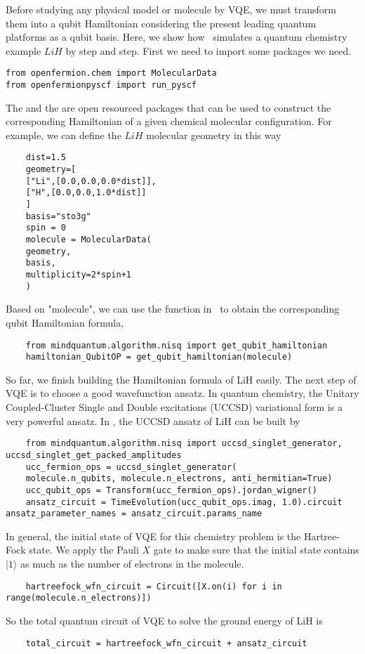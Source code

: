 Before studying any physical model or molecule by VQE, we must transform them into a qubit Hamiltonian considering the present leading quantum platforms as a qubit basis.
Here, we show how \MindQuantum\ simulates a quantum chemistry example $LiH$ by step and step.
First we need to import some packages we need.
\begin{lstlisting}
from openfermion.chem import MolecularData
from openfermionpyscf import run_pyscf
\end{lstlisting}
The  and the  are open resourced packages that can be used to construct the corresponding Hamiltonian of a given chemical molecular configuration. For example, we can define the $LiH$ molecular geometry in this way
\begin{lstlisting}
    dist=1.5
    geometry=[
    ["Li",[0.0,0.0,0.0*dist]],
    ["H",[0.0,0.0,1.0*dist]]
    ]
    basis="sto3g"
    spin = 0
    molecule = MolecularData(
    geometry,
    basis,
    multiplicity=2*spin+1
    )
\end{lstlisting}
Based on "molecule", we can use the function in \MindQuantum\ to obtain the corresponding qubit Hamiltonian formula,
\begin{lstlisting}
    from mindquantum.algorithm.nisq import get_qubit_hamiltonian
    hamiltonian_QubitOP = get_qubit_hamiltonian(molecule)
\end{lstlisting}
So far, we finish building the Hamiltonian formula of LiH easily.
The next step of VQE is to choose a good wavefunction ansatz. In quantum chemistry, the Unitary Coupled-Cluster Single and Double excitations (UCCSD) variational form is a very powerful ansatz. In \MindQuantum, the UCCSD ansatz of LiH can be built by
\begin{lstlisting}
    from mindquantum.algorithm.nisq import uccsd_singlet_generator, uccsd_singlet_get_packed_amplitudes
    ucc_fermion_ops = uccsd_singlet_generator(
    molecule.n_qubits, molecule.n_electrons, anti_hermitian=True)
    ucc_qubit_ops = Transform(ucc_fermion_ops).jordan_wigner()
    ansatz_circuit = TimeEvolution(ucc_qubit_ops.imag, 1.0).circuit
ansatz_parameter_names = ansatz_circuit.params_name
\end{lstlisting}
In general, the initial state of VQE for this chemistry problem is the Hartree-Fock state. We apply the Pauli $X$ gate to make sure that the initial state contains $|1\rangle$ as much as the number of electrons in the molecule.
\begin{lstlisting}
    hartreefock_wfn_circuit = Circuit([X.on(i) for i in range(molecule.n_electrons)])
\end{lstlisting}
So the total quantum circuit of VQE to solve the ground energy of LiH is
\begin{lstlisting}
    total_circuit = hartreefock_wfn_circuit + ansatz_circuit
\end{lstlisting}

